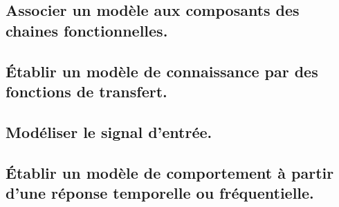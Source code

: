 \documentclass[10pt,fleqn]{article}
\newcommand{\repRel}{../..}
\newcommand{\repStyle}{\repRel/Style}
\newcommand{\td}{fichier_td}
\newcommand{\repExos}{\repRel/ExercicesCompetences}
\newcommand{\repExo}{dossier}
\begin{document}
\begin{multicols}{2} 

\end{multicols}

\subsection{Associer un modèle aux composants des chaines fonctionnelles.} 

\begin{multicols}{2} 

\end{multicols}

\subsection{Établir un modèle de connaissance par des fonctions de transfert.} 

\begin{multicols}{2} 

\renewcommand{\repExo}{\repExos/B2_ProposerModele/B2_04_ModeleConnaissance/51_MCC}
\renewcommand{\td}{51_MCC}
\graphicspath{{\repStyle/png/}{\repExo/images/}}


\end{multicols}

\subsection{Modéliser le signal d'entrée.} 

\begin{multicols}{2} 

\end{multicols}

\subsection{Établir un modèle de comportement à partir d'une réponse temporelle ou fréquentielle. } 

\begin{multicols}{2} 

\renewcommand{\repExo}{\repExos/B2_ProposerModele/B2_06_ModeleComportement/502_Divers}
\renewcommand{\td}{502_Divers}
\graphicspath{{\repStyle/png/}{\repExo/images/}}


\renewcommand{\repExo}{\repExos/B2_ProposerModele/B2_06_ModeleComportement/503_Divers}
\renewcommand{\td}{503_Divers}
\graphicspath{{\repStyle/png/}{\repExo/images/}}


\renewcommand{\repExo}{\repExos/B2_ProposerModele/B2_06_ModeleComportement/504_Divers}
\renewcommand{\td}{504_Divers}
\graphicspath{{\repStyle/png/}{\repExo/images/}}


\renewcommand{\repExo}{\repExos/B2_ProposerModele/B2_06_ModeleComportement/506_Divers}
\renewcommand{\td}{506_Divers}
\graphicspath{{\repStyle/png/}{\repExo/images/}}


\end{multicols}
\end{document}
